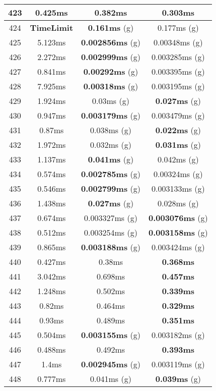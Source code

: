 \begin{table}[H]
\begin{minipage}{5cm}
{\begin{tabular}{|c|c|c|c|}
\hline
423 & 0.425ms & 0.382ms & \textbf{0.303ms} \\
\hline
424 & \textbf{TimeLimit} & \textbf{0.161ms} (g) & 0.177ms (g) \\
\hline
425 & 5.123ms & \textbf{0.002856ms} (g) & 0.00348ms (g) \\
\hline
426 & 2.272ms & \textbf{0.002999ms} (g) & 0.003285ms (g) \\
\hline
427 & 0.841ms & \textbf{0.00292ms} (g) & 0.003395ms (g) \\
\hline
428 & 7.925ms & \textbf{0.00318ms} (g) & 0.003195ms (g) \\
\hline
429 & 1.924ms & 0.03ms (g) & \textbf{0.027ms} (g) \\
\hline
430 & 0.947ms & \textbf{0.003179ms} (g) & 0.003479ms (g) \\
\hline
431 & 0.87ms & 0.038ms (g) & \textbf{0.022ms} (g) \\
\hline
432 & 1.972ms & 0.032ms (g) & \textbf{0.031ms} (g) \\
\hline
433 & 1.137ms & \textbf{0.041ms} (g) & 0.042ms (g) \\
\hline
434 & 0.574ms & \textbf{0.002785ms} (g) & 0.00324ms (g) \\
\hline
435 & 0.546ms & \textbf{0.002799ms} (g) & 0.003133ms (g) \\
\hline
436 & 1.438ms & \textbf{0.027ms} (g) & 0.028ms (g) \\
\hline
437 & 0.674ms & 0.003327ms (g) & \textbf{0.003076ms} (g) \\
\hline
438 & 0.512ms & 0.003254ms (g) & \textbf{0.003158ms} (g) \\
\hline
439 & 0.865ms & \textbf{0.003188ms} (g) & 0.003424ms (g) \\
\hline
440 & 0.427ms & 0.38ms & \textbf{0.368ms} \\
\hline
441 & 3.042ms & 0.698ms & \textbf{0.457ms} \\
\hline
442 & 1.248ms & 0.502ms & \textbf{0.339ms} \\
\hline
443 & 0.82ms & 0.464ms & \textbf{0.329ms} \\
\hline
444 & 0.93ms & 0.489ms & \textbf{0.351ms} \\
\hline
445 & 0.504ms & \textbf{0.003155ms} (g) & 0.003182ms (g) \\
\hline
446 & 0.488ms & 0.492ms & \textbf{0.393ms} \\
\hline
447 & 1.4ms & \textbf{0.002945ms} (g) & 0.003119ms (g) \\
\hline
448 & 0.777ms & 0.041ms (g) & \textbf{0.039ms} (g) \\

\end{tabular}}
\end{minipage}
\end{table}
